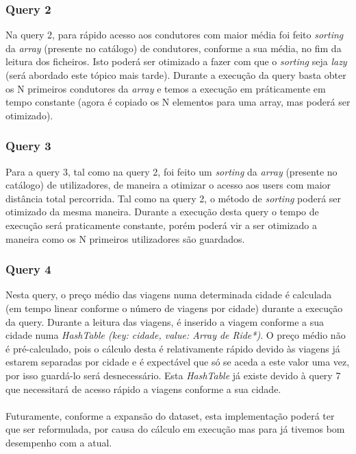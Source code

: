 \documentclass{article}
\begin{document}
        \subsubsection{Query 2}
            Na query 2, para rápido acesso aos condutores com maior média foi 
            feito \emph{sorting} da \emph{array} (presente no catálogo) de 
            condutores, conforme a sua média, no fim da leitura dos ficheiros.
            Isto poderá ser otimizado a fazer com que o \emph{sorting} seja
            \emph{lazy} (será abordado este tópico mais tarde).
            Durante a execução da query basta obter os N primeiros 
            condutores da \emph{array} e temos a execução em práticamente em
            tempo constante (agora é copiado os N elementos para uma array, mas
            poderá ser otimizado).
        \subsubsection{Query 3}
            Para a query 3, tal como na query 2, foi feito um \emph{sorting} da
            \emph{array} (presente no catálogo) de utilizadores, de maneira a 
            otimizar o acesso aos users com maior distância total percorrida.
            Tal como na query 2, o método de \emph{sorting} poderá ser otimizado
            da mesma maneira.
            Durante a execução desta query o tempo de execução será praticamente
            constante, porém poderá vir a ser otimizado a maneira como os N
            primeiros utilizadores são guardados.        
        \subsubsection{Query 4}
            Nesta query, o preço médio das viagens numa determinada cidade é 
            calculada (em tempo linear conforme o número de viagens por cidade)
            durante a execução da query. Durante a leitura das viagens,
            é inserido a viagem conforme a sua cidade numa 
            \emph{HashTable (key: cidade, value: Array de Ride*)}. 
            O preço médio não é pré-calculado, pois o cálculo desta é 
            relativamente rápido devido às viagens já estarem separadas por cidade
            e é expectável que só se aceda a este valor uma vez, por isso
            guardá-lo será desnecessário.
            Esta \emph{HashTable} já existe devido à query 7 que necessitará de
            acesso rápido a viagens conforme a sua cidade. 
            \\
            \\Futuramente, conforme a expansão do dataset, esta implementação 
            poderá ter que ser reformulada, por causa do cálculo em execução mas
            para já tivemos bom desempenho com a atual.
        
\end{document}

